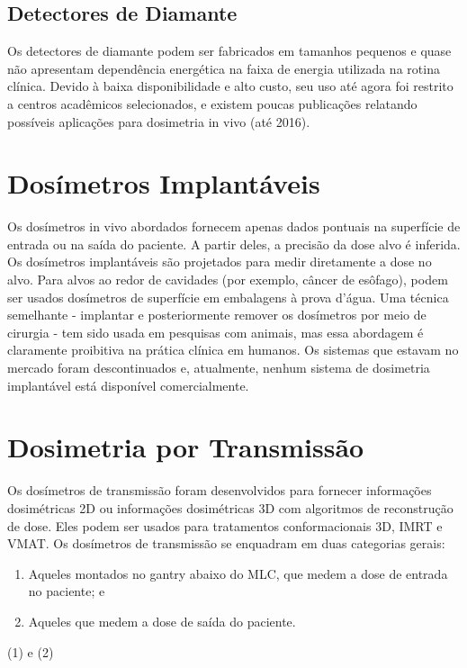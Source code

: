 \documentclass[11pt,a4paper]{article}
\newcounter{exemplo}
\begin{document}
\subsection{Detectores de Diamante}

	Os detectores de diamante podem ser fabricados em tamanhos pequenos e quase não apresentam dependência energética na faixa de energia utilizada na rotina clínica. Devido à baixa disponibilidade e alto custo, seu uso até agora foi restrito a centros acadêmicos selecionados, e existem poucas publicações relatando possíveis aplicações para dosimetria in vivo (até 2016).

\section{Dosímetros Implantáveis}

	Os dosímetros in vivo abordados fornecem apenas dados pontuais na superfície de entrada ou  na saída do paciente. A partir deles, a precisão da dose alvo é inferida. Os dosímetros implantáveis são projetados para medir diretamente a dose no alvo. Para alvos ao redor de cavidades (por exemplo, câncer de esôfago), podem ser usados dosímetros de superfície em embalagens à prova d'água. Uma técnica semelhante - implantar e posteriormente remover os dosímetros por meio de cirurgia - tem sido usada em pesquisas com animais, mas essa abordagem é claramente proibitiva na prática clínica em humanos. Os sistemas que estavam no mercado foram descontinuados e, atualmente, nenhum sistema de dosimetria implantável está disponível comercialmente.

\section{Dosimetria por Transmissão}

	Os dosímetros de transmissão foram desenvolvidos para fornecer informações dosimétricas 2D ou informações dosimétricas 3D com algoritmos de reconstrução de dose. Eles podem ser usados para tratamentos conformacionais 3D, IMRT e VMAT. Os dosímetros de transmissão se enquadram em duas categorias gerais:
	
	\begin{enumerate}
		\item Aqueles montados no gantry abaixo do MLC, que medem a dose de entrada no paciente; e
		\item Aqueles que medem a dose de saída do paciente.
	\end{enumerate}
	(1)  e (2) 
\end{document}
